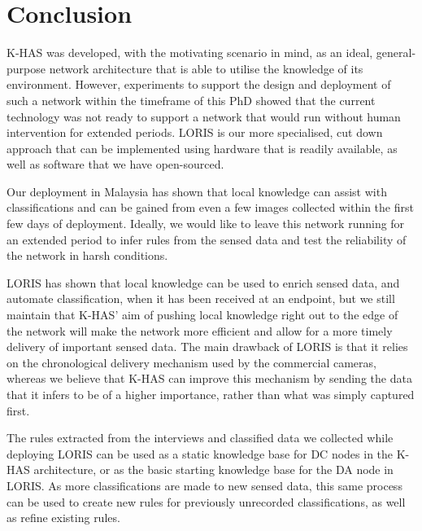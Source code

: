 	\section{Conclusion}\label{loris:conc}
	 K-HAS was developed, with the motivating scenario in mind, as an ideal, general-purpose network architecture that is able to utilise the knowledge of its environment. However, experiments to support the design and deployment of such a network within the timeframe of this PhD showed that the current technology was not ready to support a network that would run without human intervention for extended periods. LORIS is our more specialised, cut down approach that can be implemented using hardware that is readily available, as well as software that we have open-sourced. 
	
	Our deployment in Malaysia has shown that local knowledge can assist with classifications and can be gained from even a few images collected within the first few days of deployment. Ideally, we would like to leave this network running for an extended period to infer rules from the sensed data and test the reliability of the network in harsh conditions. 
	
	LORIS has shown that local knowledge can be used to enrich sensed data, and automate classification, when it has been received at an endpoint, but we still maintain that K-HAS' aim of pushing local knowledge right out to the edge of the network will make the network more efficient and allow for a more timely delivery of important sensed data.  The main drawback of LORIS is that it relies on the chronological delivery mechanism used by the commercial cameras, whereas we believe that K-HAS can improve this mechanism by sending the data that it infers to be of a higher importance, rather than what was simply captured first.
    
    The rules extracted from the interviews and classified data we collected while deploying LORIS can be used as a static knowledge base for DC nodes in the K-HAS architecture, or as the basic starting knowledge base for the DA node in LORIS. As more classifications are made to new sensed data, this same process can be used to create new rules for previously unrecorded classifications, as well as refine existing rules. 